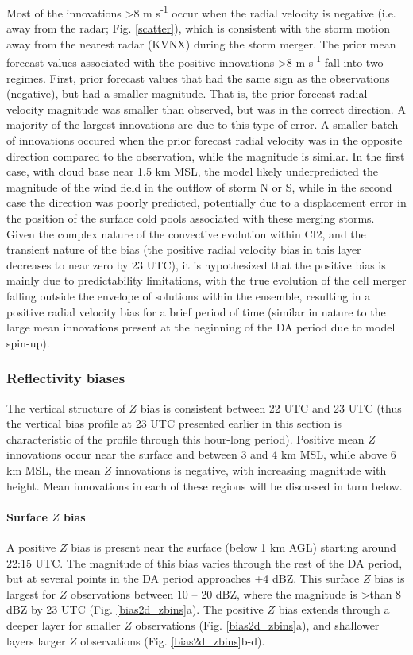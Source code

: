Most of the innovations \textgreater 8 m s\textsuperscript{-1} occur when the radial velocity is negative (i.e. away from the radar; Fig. \ref{scatter}), which is consistent with the storm motion away from the nearest radar (KVNX) during the storm merger. The prior mean forecast values associated with the positive innovations \textgreater 8 m s\textsuperscript{-1} fall into two regimes. First, prior forecast values that had the same sign as the observations (negative), but had a smaller magnitude. That is, the prior forecast radial velocity magnitude was smaller than observed, but was in the correct direction. A majority of the largest innovations are due to this type of error. A smaller batch of innovations occured when the prior forecast radial velocity was in the opposite direction compared to the observation, while the magnitude is similar. In the first case, with cloud base near 1.5 km MSL, the model likely underpredicted the magnitude of the wind field in the outflow of storm N or S, while in the second case the direction was poorly predicted, potentially due to a displacement error in the position of the surface cold pools associated with these merging storms. Given the complex nature of the convective evolution within CI2, and the transient nature of the bias (the positive radial velocity bias in this layer decreases to near zero by 23 UTC), it is hypothesized that the positive bias is mainly due to predictability limitations, with the true evolution of the cell merger falling outside the envelope of solutions within the ensemble, resulting in a positive radial velocity bias for a brief period of time (similar in nature to the large mean innovations present at the beginning of the DA period due to model spin-up).

\subsubsection{Reflectivity biases}
The vertical structure of \(Z\) bias is consistent between 22 UTC and 23 UTC (thus the vertical bias profile at 23 UTC presented earlier in this section is characteristic of the profile through this hour-long period). Positive mean \(Z\) innovations occur near the surface and between 3 and 4 km MSL, while above 6 km MSL, the mean \(Z\) innovations is negative, with increasing magnitude with height. Mean innovations in each of these regions will be discussed in turn below.

\paragraph{Surface \(Z\) bias}
A positive \(Z\) bias is present near the surface (below 1 km AGL) starting around 22:15 UTC. The magnitude of this bias varies through the rest of the DA period, but at several points in the DA period approaches +4 dBZ. This surface \(Z\) bias is largest for \(Z\) observations between 10 -- 20 dBZ, where the magnitude is \textgreater than 8 dBZ by 23 UTC (Fig. \ref{bias2d_zbins}a). The positive \(Z\) bias extends through a deeper layer for smaller \(Z\) observations (Fig. \ref{bias2d_zbins}a), and shallower layers larger \(Z\) observations (Fig. \ref{bias2d_zbins}b-d).

